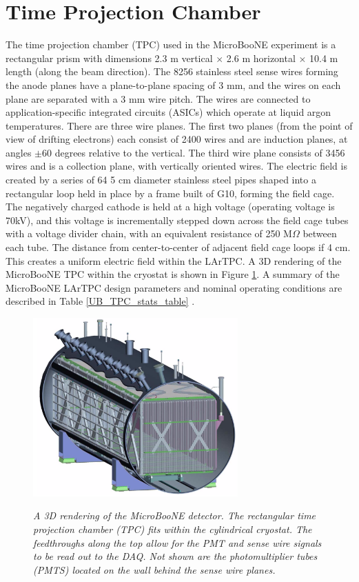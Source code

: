 \section{Time Projection Chamber}
The time projection chamber (TPC) used in the MicroBooNE experiment is a rectangular prism with dimensions 2.3 m vertical $\times$ 2.6 m horizontal $\times$ 10.4 m length (along the beam direction). The 8256 stainless steel sense wires forming the anode planes have a plane-to-plane spacing of 3 mm, and the wires on each plane are separated with a 3 mm wire pitch. The wires are connected to application-specific integrated circuits (ASICs) which operate at liquid argon temperatures. There are three wire planes. The first two planes (from the point of view of drifting electrons) each consist of 2400 wires and are induction planes, at angles $\pm60$ degrees relative to the vertical. The third wire plane consists of 3456 wires and is a collection plane, with vertically oriented wires. The electric field is created by a series of 64 5 cm diameter stainless steel pipes shaped into a rectangular loop held in place by a frame built of G10, forming the field cage. The negatively charged cathode is held at a high voltage (operating voltage is 70kV), and this voltage is incrementally stepped down across the field cage tubes with a voltage divider chain, with an equivalent resistance of 250 M$\Omega$ between each tube. The distance from center-to-center of adjacent field cage loops if 4 cm. This creates a uniform electric field within the LArTPC. A 3D rendering of the MicroBooNE TPC within the cryostat is shown in Figure \ref{cryo_3D_rendering_fig}. A summary of the MicroBooNE LArTPC design parameters and nominal operating conditions are described in Table \ref{UB_TPC_stats_table} \cite{UBDetectorPaper}.


\begin{figure}[ht!]
\centering
	\includegraphics[width=0.7\textwidth]{Figures/cryo_3D_rendering.png} \\
\caption{\textit{A 3D rendering of the MicroBooNE detector. The rectangular time projection chamber (TPC) fits within the cylindrical cryostat. The feedthroughs along the top allow for the PMT and sense wire signals to be read out to the DAQ. Not shown are the photomultiplier tubes (PMTS) located on the wall behind the sense wire planes.}}\label{cryo_3D_rendering_fig}
\end{figure}


